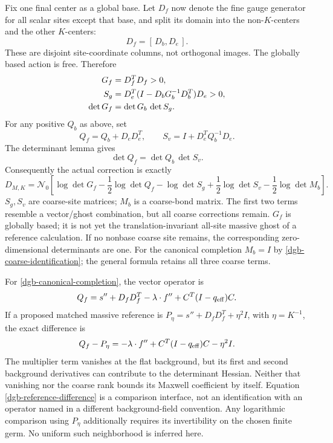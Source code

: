 \documentclass[11pt]{article}
\theoremstyle{remark}
\begin{document}
Fix one final center as a global base. Let $D_f$ now denote
the fine gauge generator for all scalar sites except that
base, and split its domain into the non-$K$-centers and the
other $K$-centers:
\[
                            D_f=[\,D_b,D_e\,].
\]
These are disjoint site-coordinate columns, not orthogonal
images. The globally based action is free. Therefore
\begin{align}
 G_f&=D_f^TD_f>0,\notag\\
 S_g&=D_e^T(I-D_bG_b^{-1}D_b^T)D_e>0,\notag\\
 \det G_f&=\det G_b\,\det S_g .
 \label{dgb-ghost-Schur}
\end{align}
For any positive $Q_b$ as above, set
\begin{equation}
 Q_f=Q_b+D_eD_e^T,\qquad
 S_v=I+D_e^TQ_b^{-1}D_e.
 \label{dgb-vector-Schur-data}
\end{equation}
The determinant lemma gives
\begin{equation}
                         \det Q_f=\det Q_b\,\det S_v .
 \label{dgb-vector-Schur}
\end{equation}
Consequently the actual correction is exactly
\begin{equation}
 D_{M,K}=\mathcal N_0\left[
   \log\det G_f-\frac12\log\det Q_f
   -\log\det S_g+\frac12\log\det S_v
   -\frac12\log\det M_b\right].
 \label{dgb-full-decomposition}
\end{equation}
$S_g,S_v$ are coarse-site matrices; $M_b$ is a coarse-bond
matrix. The first two terms resemble a vector/ghost
combination, but all coarse corrections remain.
$G_f$ is globally based; it is not yet the translation-invariant
all-site massive ghost of a reference calculation.
If no nonbase coarse site remains, the corresponding
zero-dimensional determinants are one. For the canonical
completion $M_b=I$ by \eqref{dgb-coarse-identification};
the general formula retains all three coarse terms.

For \eqref{dgb-canonical-completion}, the vector operator is
\begin{equation}
 Q_f=s''+D_fD_f^T-\lambda\cdot f''
                         +C^T(I-q_{\rm eff})C.
 \label{dgb-vector-operator}
\end{equation}
If a proposed matched massive reference is
$P_\eta=s''+D_fD_f^T+\eta^2I$, with $\eta=K^{-1}$,
the exact difference is
\begin{equation}
 Q_f-P_\eta=-\lambda\cdot f''
                     +C^T(I-q_{\rm eff})C-\eta^2I.
 \label{dgb-reference-difference}
\end{equation}
The multiplier term vanishes at the flat background,
but its first and second background derivatives can
contribute to the determinant Hessian. Neither that
vanishing nor the coarse rank bounds its Maxwell
coefficient by itself. Equation
\eqref{dgb-reference-difference} is a comparison interface,
not an identification with an operator named in a
different background-field convention.
Any logarithmic comparison using $P_\eta$ additionally
requires its invertibility on the chosen finite germ.
No uniform such neighborhood is inferred here.
\end{document}
